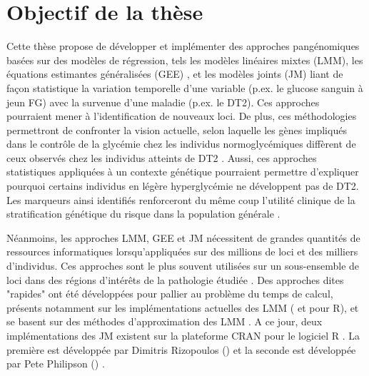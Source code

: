 \documentclass[11pt, a4paper]{article}
\begin{document}
\clearpage
\section{Objectif de la thèse}
\par{Cette thèse propose de développer et implémenter des approches pangénomiques basées sur des modèles de régression, tels les modèles linéaires mixtes (LMM), les équations estimantes généralisées (GEE) \citep{sitlani_generalized_2015},
et les modèles joints (JM) liant de façon statistique la variation temporelle d’une variable (p.ex. le glucose sanguin à jeun FG) avec la survenue d’une maladie (p.ex. le DT2).
Ces approches pourraient mener à l’identification de nouveaux loci.
De plus, ces méthodologies permettront de confronter la vision actuelle,
selon laquelle les gènes impliqués dans le contrôle de la glycémie chez les individus normoglycémiques diffèrent de ceux observés chez les individus atteints de DT2 \citep{yaghootkar_recent_2013}.
Aussi, ces approches statistiques appliquées à un contexte génétique pourraient permettre d’expliquer pourquoi certains individus en légère hyperglycémie ne développent pas de DT2.
Les marqueurs ainsi identifiés renforceront du même coup l’utilité clinique de la stratification génétique du risque dans la population générale \citep{pal_genetics_2013}.}

\par{Néanmoins, les approches LMM, GEE et JM nécessitent de grandes quantités de ressources informatiques lorsqu’appliquées sur des millions de loci et des milliers d’individus.
Ces approches sont le plus souvent utilisées sur un sous-ensemble de loci dans des régions d’intérêts de la pathologie étudiée \citep{beyene_longitudinal_2014, wu_longitudinal_2014}.
Des approches dites "rapides" ont été développées pour pallier au problème du temps de calcul, présents notamment sur les
implémentations actuelles des LMM ( et  pour R), et se basent sur des méthodes
d’approximation des LMM \citep{sikorska_fast_2013, sikorska_gwas_2015, sikorska_computationally_2014}.
A ce jour, deux implémentations des JM existent sur la plateforme CRAN pour le logiciel R \citep{Rsoftware}.
La première est développée par Dimitris Rizopoulos () \citep{rizopoulos_jm_2010} et la seconde est développée par Pete Philipson () \citep{philipson_joiner_2012}.}
\end{document}
